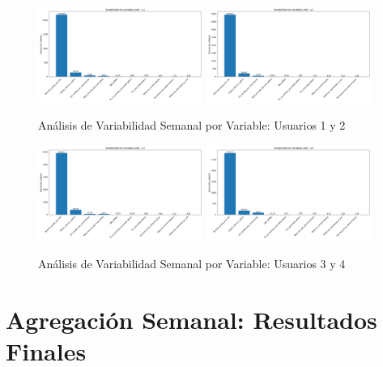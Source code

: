 \documentclass[12pt,letterpaper,twoside]{report}
\begin{document}
\begin{figure}[H]
\centering
\includegraphics[width=0.48\textwidth]{figuras/variabilidad_variables_u1.png}
\includegraphics[width=0.48\textwidth]{figuras/variabilidad_variables_u2.png}
\caption{Análisis de Variabilidad Semanal por Variable: Usuarios 1 y 2}
\label{fig:variabilidad_ejemplo}
\end{figure}

\begin{figure}[H]
\centering
\includegraphics[width=0.48\textwidth]{figuras/variabilidad_variables_u3.png}
\includegraphics[width=0.48\textwidth]{figuras/variabilidad_variables_u4.png}
\caption{Análisis de Variabilidad Semanal por Variable: Usuarios 3 y 4}
\label{fig:variabilidad_u34}
\end{figure}

\section{Agregación Semanal: Resultados Finales}
\end{document}
